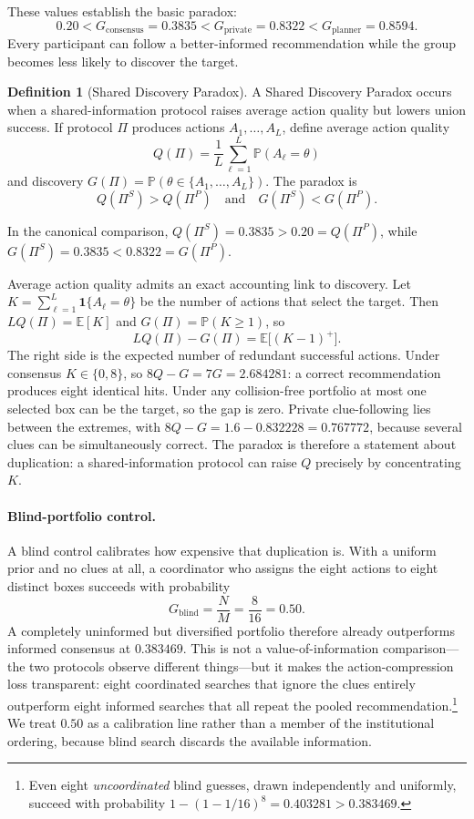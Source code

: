 \documentclass[11pt]{article}
\theoremstyle{definition}
\newtheorem{definition}{Definition}
\theoremstyle{remark}
\newcommand{\E}{\mathbb{E}}
\newcommand{\Prob}{\mathbb{P}}
\newcommand{\1}{\mathbf{1}}
\newcommand{\priv}{\mathrm{private}}
\newcommand{\cons}{\mathrm{consensus}}
\newcommand{\plan}{\mathrm{planner}}
\begin{document}
These values establish the basic paradox:
\[
0.20 < G_{\cons}=0.3835 < G_{\priv}=0.8322 < G_{\plan}=0.8594.
\]
Every participant can follow a better-informed recommendation while the group becomes less likely to discover the target.

\begin{definition}[Shared Discovery Paradox]
A Shared Discovery Paradox occurs when a shared-information protocol raises average action quality but lowers union success. If protocol $\Pi$ produces actions $A_1,\ldots,A_L$, define average action quality
\[
Q(\Pi)=\frac{1}{L}\sum_{\ell=1}^L \Prob(A_\ell=\theta)
\]
and discovery $G(\Pi)=\Prob(\theta\in\{A_1,\ldots,A_L\})$. The paradox is
\[
Q(\Pi^{S})>Q(\Pi^{P})
\quad\text{and}\quad
G(\Pi^{S})<G(\Pi^{P}).
\]
\end{definition}

In the canonical comparison, $Q(\Pi^{S})=0.3835>0.20=Q(\Pi^{P})$, while $G(\Pi^{S})=0.3835<0.8322=G(\Pi^{P})$.

Average action quality admits an exact accounting link to discovery. Let $K=\sum_{\ell=1}^{L}\1\{A_\ell=\theta\}$ be the number of actions that select the target. Then $LQ(\Pi)=\E[K]$ and $G(\Pi)=\Prob(K\ge1)$, so
\begin{equation}
LQ(\Pi)-G(\Pi)=\E\bigl[(K-1)^{+}\bigr].
\label{eq:redundancy}
\end{equation}
The right side is the expected number of redundant successful actions. Under consensus $K\in\{0,8\}$, so $8Q-G=7G=2.684281$: a correct recommendation produces eight identical hits. Under any collision-free portfolio at most one selected box can be the target, so the gap is zero. Private clue-following lies between the extremes, with $8Q-G=1.6-0.832228=0.767772$, because several clues can be simultaneously correct. The paradox is therefore a statement about duplication: a shared-information protocol can raise $Q$ precisely by concentrating $K$.

\paragraph{Blind-portfolio control.}
A blind control calibrates how expensive that duplication is. With a uniform prior and no clues at all, a coordinator who assigns the eight actions to eight distinct boxes succeeds with probability
\[
G_{\mathrm{blind}}=\frac{N}{M}=\frac{8}{16}=0.50.
\]
A completely uninformed but diversified portfolio therefore already outperforms informed consensus at $0.383469$. This is not a value-of-information comparison---the two protocols observe different things---but it makes the action-compression loss transparent: eight coordinated searches that ignore the clues entirely outperform eight informed searches that all repeat the pooled recommendation.\footnote{Even eight \emph{uncoordinated} blind guesses, drawn independently and uniformly, succeed with probability $1-(1-1/16)^{8}=0.403281>0.383469$.} We treat $0.50$ as a calibration line rather than a member of the institutional ordering, because blind search discards the available information.
\end{document}
